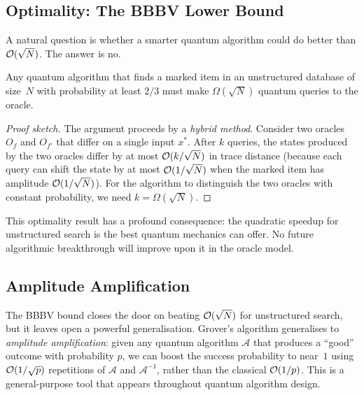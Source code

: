 \subsection{Optimality: The BBBV Lower Bound}
\label{subsec:bbbv}

A natural question is whether a smarter quantum algorithm could do better than $\mathcal{O}(\sqrt{N})$.  The answer is no.

\begin{theorem}
\label{thm:bbbv}
Any quantum algorithm that finds a marked item in an unstructured database of size~$N$ with probability at least $2/3$ must make $\Omega(\sqrt{N})$ quantum queries to the oracle.
\end{theorem}

\begin{proof}[Proof sketch]
The argument proceeds by a \emph{hybrid method}.  Consider two oracles $O_f$ and $O_{f'}$ that differ on a single input $x^*$.  After $k$ queries, the states produced by the two oracles differ by at most $\mathcal{O}(k/\sqrt{N})$ in trace distance (because each query can shift the state by at most $\mathcal{O}(1/\sqrt{N})$ when the marked item has amplitude $\mathcal{O}(1/\sqrt{N})$).  For the algorithm to distinguish the two oracles with constant probability, we need $k = \Omega(\sqrt{N})$.
\end{proof}

This optimality result has a profound consequence: the quadratic speedup for unstructured search is the best quantum mechanics can offer.  No future algorithmic breakthrough will improve upon it in the oracle model.


\subsection{Amplitude Amplification}
\label{subsec:amplitude-amplification}

The BBBV bound closes the door on beating $\mathcal{O}(\sqrt{N})$ for unstructured search, but it leaves open a powerful generalisation.  Grover's algorithm generalises to \emph{amplitude amplification}: given any quantum algorithm $\mathcal{A}$ that produces a ``good'' outcome with probability $p$, we can boost the success probability to near~$1$ using $\mathcal{O}(1/\sqrt{p})$ repetitions of $\mathcal{A}$ and $\mathcal{A}^{-1}$, rather than the classical $\mathcal{O}(1/p)$.  This is a general-purpose tool that appears throughout quantum algorithm design.


